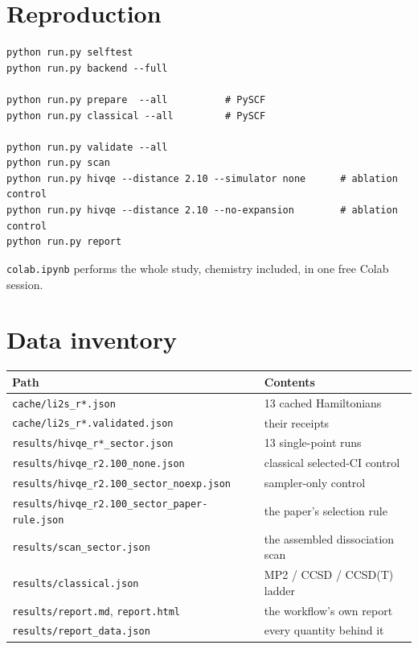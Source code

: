 \documentclass[11pt,a4paper]{article}
\newcommand{\code}[1]{\texttt{\small #1}}
\begin{document}
\section{Reproduction}

\begin{verbatim}
python run.py selftest
python run.py backend --full

python run.py prepare  --all          # PySCF
python run.py classical --all         # PySCF

python run.py validate --all
python run.py scan
python run.py hivqe --distance 2.10 --simulator none      # ablation control
python run.py hivqe --distance 2.10 --no-expansion        # ablation control
python run.py report
\end{verbatim}

\code{colab.ipynb} performs the whole study, chemistry included, in one free
Colab session.

\section{Data inventory}

\begin{center}
\small
\begin{tabular}{ll}
\toprule
Path & Contents \\
\midrule
\code{cache/li2s\_r*.json}         & 13 cached Hamiltonians \\
\code{cache/li2s\_r*.validated.json} & their receipts \\
\code{results/hivqe\_r*\_sector.json} & 13 single-point runs \\
\code{results/hivqe\_r2.100\_none.json} & classical selected-CI control \\
\code{results/hivqe\_r2.100\_sector\_noexp.json} & sampler-only control \\
\code{results/hivqe\_r2.100\_sector\_paper-rule.json} & the paper's selection rule \\
\code{results/scan\_sector.json}   & the assembled dissociation scan \\
\code{results/classical.json}      & MP2 / CCSD / CCSD(T) ladder \\
\code{results/report.md}, \code{report.html} & the workflow's own report \\
\code{results/report\_data.json}   & every quantity behind it \\
\bottomrule
\end{tabular}
\end{center}
\end{document}
